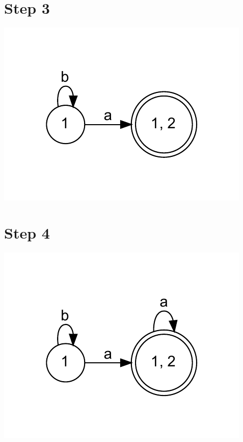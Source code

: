 \documentclass{article}
\begin{document}
\section{Step 3}
\begin{center}
\includegraphics[width=\textwidth]{step2.dot.pdf}
\end{center}
\section{Step 4}
\begin{center}
\includegraphics[width=\textwidth]{step3.dot.pdf}
\end{center}
\end{document}
